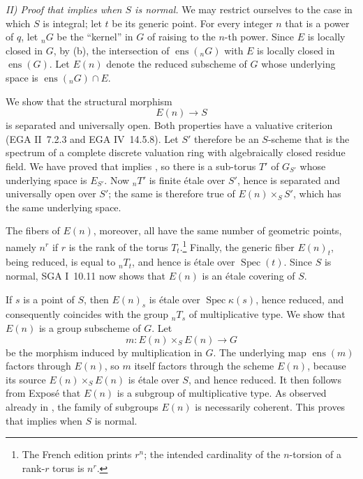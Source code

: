 \medskip
\noindent\textit{II) Proof that \textup{} implies
\textup{} when \(S\) is normal.}\quad
We may restrict ourselves to the case in which \(S\) is integral;
let \(t\) be its generic point. For every integer \(n\) that is a
power of \(q\), let \({}_nG\) be the ``kernel'' in \(G\) of
raising to the \(n\)-th power. Since \(E\) is locally closed in
\(G\), by (b), the intersection of
\(\operatorname{ens}({}_nG)\) with \(E\) is locally closed in
\(\operatorname{ens}(G)\). Let \(E(n)\) denote the reduced
subscheme of \(G\) whose underlying space is
\(\operatorname{ens}({}_nG)\cap E\).

We show that the structural morphism
\[
  E(n)\longrightarrow S
\]
is separated and universally open. Both properties have a
valuative criterion (EGA II~7.2.3 and EGA IV~14.5.8). Let
\(S'\) therefore be an \(S\)-scheme that is the spectrum of a
complete discrete valuation ring with algebraically closed residue
field. We have proved that  implies , so there is a
sub-torus \(T'\) of \(G_{S'}\) whose underlying space is
\(E_{S'}\). Now \({}_nT'\) is finite étale over \(S'\), hence is
separated and universally open over \(S'\); the same is therefore
true of \(E(n)\times_S S'\), which has the same underlying space.

The fibers of \(E(n)\), moreover, all have the same number of
geometric points, namely \(n^r\) if \(r\) is the rank of the torus
\(T_t\).\footnote{The French edition prints \(r^n\); the intended
cardinality of the \(n\)-torsion of a rank-\(r\) torus is \(n^r\).}
Finally, the generic fiber \(E(n)_t\), being reduced, is equal to
\({}_nT_t\), and hence is étale over \(\operatorname{Spec}(t)\).
Since \(S\) is normal, SGA I~10.11 now shows that \(E(n)\) is an
étale covering of \(S\).

If \(s\) is a point of \(S\), then \(E(n)_s\) is étale over
\(\operatorname{Spec}\kappa(s)\), hence reduced, and consequently
coincides with the group \({}_nT_s\) of multiplicative type. We
show that \(E(n)\) is a group subscheme of \(G\). Let
\[
  m:E(n)\times_S E(n)\longrightarrow G
\]
be the morphism induced by multiplication in \(G\). The underlying
map \(\operatorname{ens}(m)\) factors through \(E(n)\), so \(m\)
itself factors through the scheme \(E(n)\), because its source
\(E(n)\times_S E(n)\) is étale over \(S\), and hence reduced. It
then follows from Exposé  that \(E(n)\) is a subgroup of
multiplicative type. As observed already in , the family of
subgroups \(E(n)\) is necessarily coherent. This proves that
 implies  when \(S\) is normal.

